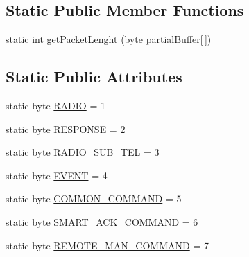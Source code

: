 \subsection*{Static Public Member Functions}
\begin{DoxyCompactItemize}
\item 
static int \hyperlink{classit_1_1polito_1_1elite_1_1enocean_1_1protocol_1_1serial_1_1v3_1_1network_1_1packet_1_1_e_s_p3_packet_a881156d98422401bb775080081b0f953}{get\+Packet\+Lenght} (byte partial\+Buffer\mbox{[}$\,$\mbox{]})
\end{DoxyCompactItemize}
\subsection*{Static Public Attributes}
\begin{DoxyCompactItemize}
\item 
static byte \hyperlink{classit_1_1polito_1_1elite_1_1enocean_1_1protocol_1_1serial_1_1v3_1_1network_1_1packet_1_1_e_s_p3_packet_ac02db26e21f598ae35cbd86b17f329b7}{R\+A\+D\+IO} = 1
\item 
static byte \hyperlink{classit_1_1polito_1_1elite_1_1enocean_1_1protocol_1_1serial_1_1v3_1_1network_1_1packet_1_1_e_s_p3_packet_a51daa38c23e332d5280a64c2db25e8a3}{R\+E\+S\+P\+O\+N\+SE} = 2
\item 
static byte \hyperlink{classit_1_1polito_1_1elite_1_1enocean_1_1protocol_1_1serial_1_1v3_1_1network_1_1packet_1_1_e_s_p3_packet_af879a8564d02f88bbab2ae22530c4a2c}{R\+A\+D\+I\+O\+\_\+\+S\+U\+B\+\_\+\+T\+EL} = 3
\item 
static byte \hyperlink{classit_1_1polito_1_1elite_1_1enocean_1_1protocol_1_1serial_1_1v3_1_1network_1_1packet_1_1_e_s_p3_packet_a20cb07b821d8777b0cbae232d57f0416}{E\+V\+E\+NT} = 4
\item 
static byte \hyperlink{classit_1_1polito_1_1elite_1_1enocean_1_1protocol_1_1serial_1_1v3_1_1network_1_1packet_1_1_e_s_p3_packet_af557ec66c1a1d261040e86da9e7596bc}{C\+O\+M\+M\+O\+N\+\_\+\+C\+O\+M\+M\+A\+ND} = 5
\item 
static byte \hyperlink{classit_1_1polito_1_1elite_1_1enocean_1_1protocol_1_1serial_1_1v3_1_1network_1_1packet_1_1_e_s_p3_packet_a4fd83e1661f90f000e490433d716d0ed}{S\+M\+A\+R\+T\+\_\+\+A\+C\+K\+\_\+\+C\+O\+M\+M\+A\+ND} = 6
\item 
static byte \hyperlink{classit_1_1polito_1_1elite_1_1enocean_1_1protocol_1_1serial_1_1v3_1_1network_1_1packet_1_1_e_s_p3_packet_a2a243e5b494589ad5ba86426e714a9a0}{R\+E\+M\+O\+T\+E\+\_\+\+M\+A\+N\+\_\+\+C\+O\+M\+M\+A\+ND} = 7

\end{DoxyCompactItemize}
